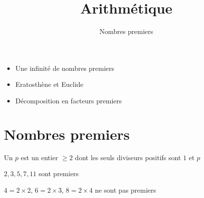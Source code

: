 


\newcommand{\entourer}[1]{\ovalbox{\color{myred}#1}}
\newcommand{\barrer}[1]{{\color{lightgray} #1}}










\title{{\bf Arithmétique}}
\subtitle{Nombres premiers}

\begin{frame}
  
  \debutmontitre

  \pause

{\footnotesize
\hfill
{}
\begin{minipage}{0.6\textwidth}
  \begin{itemize}
    \item<3-> Une infinité de nombres premiers
    \item<4-> Eratosthène et Euclide
    \item<5-> Décomposition en facteurs premiers
  \end{itemize}
\end{minipage}
}

\end{frame}

\setcounter{framenumber}{0}




\section{Nombres premiers}

\begin{frame}

\begin{mydefinition}
Un  $p$ est un entier $\ge 2$ dont les seuls diviseurs  
positifs sont $1$ et $p$
\end{mydefinition}

\pause
\bigskip

$2, 3, 5, 7, 11$ sont premiers

\pause
\medskip

$4 = 2 \times 2$, \quad $6=2 \times 3$, \quad $8= 2 \times 4$ ne sont pas premiers
\end{frame}


